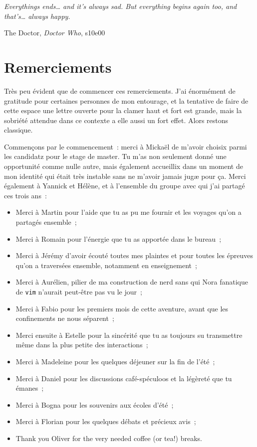 \documentclass[../main/main.tex]{subfiles}
\begin{document}
\thispagestyle{empty}
\vspace*{\fill}
\epigraph{\openquote\textit{Everythings ends… and it's always sad. But
        everything begins again too, and that's… always happy.
\closequote}}{The Doctor, \textit{Doctor Who}, s10e00}
\vspace*{\fill}

\chapter*{Remerciements}

Très peu évident que de commencer ces remerciements. J'ai énormément de
gratitude pour certaines personnes de mon entourage, et la tentative de faire de
cette espace une lettre ouverte pour la clamer haut et fort est grande, mais la
sobriété attendue dans ce contexte a elle aussi un fort effet. Alors restons
classique.

Commençons par le commencement~: merci à Mickaël de m'avoir choisix parmi les
candidatz pour le stage de master. Tu m'as non seulement donné une opportunité
comme nulle autre, mais également accueillix dans un moment de mon identité qui
était très instable sans ne m'avoir jamais jugæ pour ça. Merci également à
Yannick et Hélène, et à l'ensemble du groupe avec qui j'ai partagé ces trois
ans~:
\begin{itemize}
    \item Merci à Martin pour l'aide que tu as pu me fournir et les voyages
        qu'on a partagés ensemble~;
    \item Merci à Romain pour l'énergie que tu as apportée dans le bureau~;
    \item Merci à Jérémy d'avoir écouté toutes mes plaintes et pour toutes les
        épreuves qu'on a traversées ensemble, notamment en enseignement~;
    \item Merci à Aurélien, pilier de ma construction de nerd sans qui Nora
        fanatique de \texttt{vim} n'aurait peut-être pas vu le jour~;
    \item Merci à Fabio pour les premiers mois de cette aventure, avant que les
        confinements ne nous séparent~;
    \item Merci ensuite à Estelle pour la sincérité que tu as toujours su
        transmettre même dans la plus petite des interactions~;
    \item Merci à Madeleine pour les quelques déjeuner sur la fin de l'été~;
    \item Merci à Daniel pour les discussions café-spéculoos et la légèreté que
        tu émanes~;
    \item Merci à Bogna pour les souvenirs aux écoles d'été~;
    \item Merci à Florian pour les quelques débats et précieux avis~;
    \item Thank you Oliver for the very needed coffee (or tea!) breaks.
\end{itemize}
\end{document}
